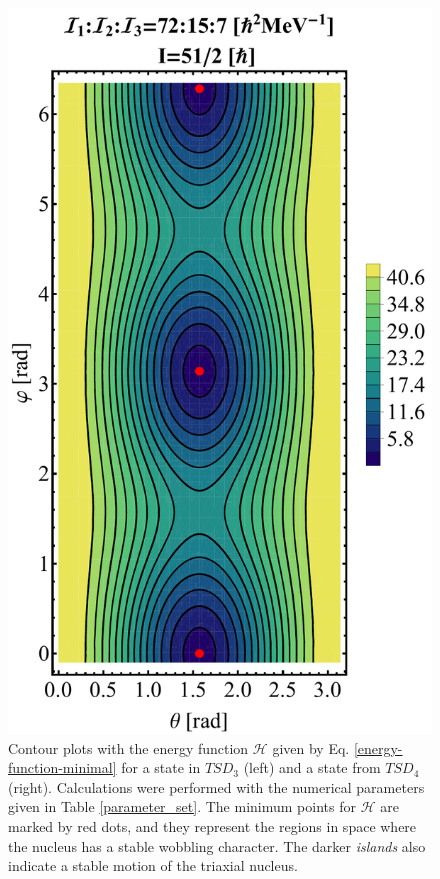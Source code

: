 \documentclass[myclassdoc,debug]{rjparticle}
\begin{document}
\begin{figure}
\begin{minipage}{.5\textwidth}
\end{minipage}%
\begin{minipage}{.5\textwidth}
  \centering
 \includegraphics[scale=0.2]{figs/contour-tsd4.pdf}
\end{minipage}
\caption{Contour plots with the energy function $\mathcal{H}$ given by Eq. \ref{energy-function-minimal} for a state in $TSD_3$ (left) and a state from $TSD_4$ (right). Calculations were performed with the numerical parameters given in Table \ref{parameter_set}. The minimum points for $\mathcal{H}$ are marked by red dots, and they represent the regions in space where the nucleus has a stable wobbling character. The darker \emph{islands} also indicate a stable motion of the triaxial nucleus.}
    \label{contours-34}
\end{figure}
\end{document}
